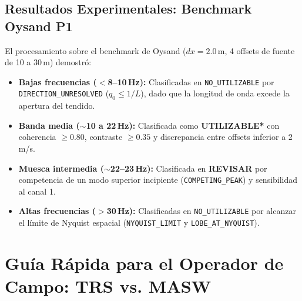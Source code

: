 \documentclass[11pt,a4paper]{article}
\begin{document}
\subsection{Resultados Experimentales: Benchmark Oysand P1}
El procesamiento sobre el benchmark de Oysand ($dx = 2.0$\,m, 4 offsets de fuente de 10 a 30\,m) demostró:
\begin{itemize}
    \item \textbf{Bajas frecuencias ($<$8--10\,Hz):} Clasificadas en \texttt{NO\_UTILIZABLE} por \texttt{DIRECTION\_UNRESOLVED} ($q_0 \le 1/L$), dado que la longitud de onda excede la apertura del tendido.
    \item \textbf{Banda media ($\sim$10 a 22\,Hz):} Clasificada como \textcolor{usablegreen}{\textbf{UTILIZABLE*}} con coherencia $\ge 0.80$, contraste $\ge 0.35$ y discrepancia entre offsets inferior a 2\,m/s.
    \item \textbf{Muesca intermedia ($\sim$22--23\,Hz):} Clasificada en \textcolor{reviewamber}{\textbf{REVISAR}} por competencia de un modo superior incipiente (\texttt{COMPETING\_PEAK}) y sensibilidad al canal 1.
    \item \textbf{Altas frecuencias ($>$30\,Hz):} Clasificadas en \texttt{NO\_UTILIZABLE} por alcanzar el límite de Nyquist espacial (\texttt{NYQUIST\_LIMIT} y \texttt{LOBE\_AT\_NYQUIST}).
\end{itemize}

\newpage
\section{Guía Rápida para el Operador de Campo: TRS vs. MASW}
\end{document}
